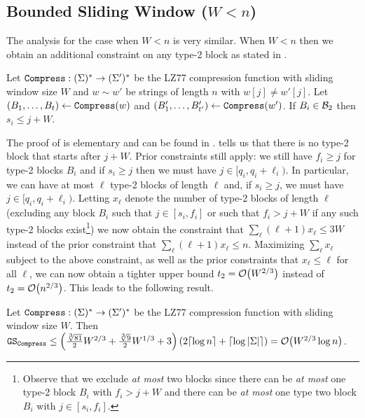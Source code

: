 \subsection{Bounded Sliding Window ($W < n$)} The analysis for the case when $W<n$ is very similar. When $W < n$ then we obtain an additional constraint on any type-2 block as stated in . 

\newcommand{\newconstraint}{
Let $\compress:(\Sigma)^*\rightarrow(\Sigma')^*$ be the LZ77 compression function with sliding window size $W$ and $w\sim w'$ be strings of length $n$ with $w[j]\neq w'[j]$. Let $(B_1,\ldots,B_t)\gets\compress(w)$ and $(B'_1,\ldots,B'_{t'})\gets\compress(w')$. If $B_i\in\B_2$ then $s_i\leq j+W$.
}
\begin{claim}
    \newconstraint
\end{claim}

The proof of  is elementary and can be found in .  tells us that there is no type-2 block that starts after $j+W$. Prior constraints still apply: we still have $f_i \geq j$ for type-2 blocks $B_i$ and if $s_i \geq j$ then we must have $j \in [q_i,q_i+\ell_i)$. In particular, we can have at most $\ell$ type-2 blocks of length $\ell$ and, if $s_i \geq j$, we must have $j \in [q_i,q_i+\ell_i)$. Letting $x_\ell$ denote the number of type-2 blocks of length $\ell$ (excluding any   block $B_i$ such that $j \in [s_i,f_i]$ or such that $f_i > j+W$ if any such type-2 blocks exist\footnote{Observe that we exclude {\em at most} two blocks since there can be {\em at most} one type-2 block $B_i$ with $f_i > j+W$  and there can be {\em at most} one type two block $B_i$ with $j \in [s_i,f_i]$. }) we now obtain the constraint that $\sum_{\ell} (\ell+1) x_\ell \leq 3W$ instead of the prior constraint that $\sum_{\ell} (\ell+1) x_\ell \leq n$. Maximizing $\sum_\ell x_\ell$ subject to the above constraint, as well as the prior constraints that $x_\ell \leq \ell $ for all $\ell$, we can now obtain a tighter upper bound $t_2 = \O{W^{2/3}}$ instead of $t_2 = \O{n^{2/3}}$. This leads to the following result.

\begin{theorem}
    Let $\mathtt{Compress}:(\Sigma)^*\rightarrow(\Sigma')^*$ be the LZ77 compression function with sliding window size $W$. Then $\GS_\compress\leq \left(\frac{\sqrt[3]{81}}{2} W^{2/3} + \frac{\sqrt[3]{9}}{2} W^{1/3} + 3\right) (2\lceil\log n\rceil+\lceil\log|\Sigma|\rceil) = \O{W^{2/3}\log n}$.
\end{theorem}


